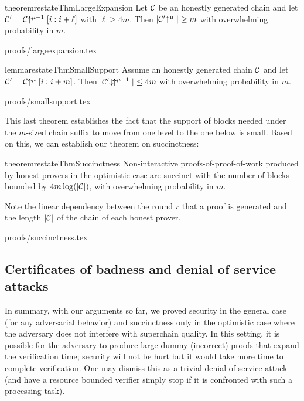 \begin{restatable}{theorem}{restateThmLargeExpansion}
    \label{thm.large-expansion}
    Let $\mathcal{C}$ be an honestly generated chain and let
    $\mathcal{C}' = \mathcal{C}\negthickspace\uparrow^{\mu - 1}[i:i + \ell]$ with $\ell \geq 4m$.
    Then $|\mathcal{C}'\negthickspace\uparrow^\mu| \geq m$
    with overwhelming probability in $m$.
\end{restatable}

{proofs/largeexpansion.tex}

\begin{restatable}{lemma}{restateThmSmallSupport}
    \label{lem.small-support}
    Assume an honestly generated chain $\mathcal{C}$ and let $\mathcal{C}' = \mathcal{C}\negthickspace\uparrow^\mu[i:i + m]$. Then
    $|\mathcal{C}'\negthickspace\downarrow\,\negthickspace\uparrow^{\mu - 1}| \leq 4m$
    with overwhelming probability in $m$.
\end{restatable}

{proofs/smallsupport.tex}

This last theorem establishes the fact that the support of blocks needed under
the $m$-sized chain suffix to move from one level to the one below is small.
Based on this, we can establish our theorem on succinctness:

\begin{restatable}{theorem}{restateThmSuccinctness}
    \label{thm.succinctness}
    Non-interactive proofs-of-proof-of-work produced by honest provers in the
    optimistic case are succinct with the number of blocks bounded by $4m
    \log(|\mathcal{C}|)$, with overwhelming probability in $m$.
\end{restatable}

Note the linear dependency between the round $r$ that a proof is generated
and the length $|\mathcal{C}|$ of the chain of each honest prover.

{proofs/succinctness.tex}

\subsection{Certificates of badness and denial of service attacks}
In summary, with our arguments so far,  we proved security in the general case
(for any adversarial behavior)  and succinctness only in the optimistic case
where the adversary does not interfere with superchain quality. In this setting,
it is possible for the adversary to produce large dummy (incorrect) proofs that
expand the verification time; security will not be hurt but it would take more
time to complete verification. One may dismiss this as a trivial denial of
service attack (and have a resource bounded verifier simply stop  if it is
confronted with such a processing task).

